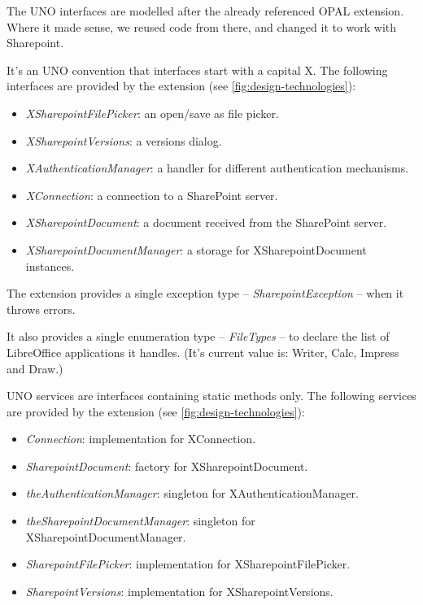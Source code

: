The UNO interfaces are modelled after the already referenced OPAL extension.
Where it made sense, we reused code from there, and changed it to work with
Sharepoint.

It's an UNO convention that interfaces start with a capital X. The following
interfaces are provided by the extension (see \autoref{fig:design-technologies}):

\begin{itemize}
\item \emph{XSharepointFilePicker}: an open/save as file picker.
\item \emph{XSharepointVersions}: a versions dialog.
\item \emph{XAuthenticationManager}: a handler for different authentication mechanisms.
\item \emph{XConnection}: a connection to a SharePoint server.
\item \emph{XSharepointDocument}: a document received from the
SharePoint server.
\item \emph{XSharepointDocumentManager}: a storage for XSharepointDocument instances.
\end{itemize}

The extension provides a single exception type -- \emph{SharepointException} --
when it throws errors.

It also provides a single enumeration type -- \emph{FileTypes} -- to declare
the list of LibreOffice applications it handles. (It's current value is:
Writer, Calc, Impress and Draw.)

UNO services are interfaces containing static methods only.  The following
services are provided by the extension (see \autoref{fig:design-technologies}):

\begin{itemize}
\item \emph{Connection}: implementation for XConnection.
\item \emph{SharepointDocument}: factory for XSharepointDocument.
\item \emph{theAuthenticationManager}: singleton for XAuthenticationManager.
\item \emph{theSharepointDocumentManager}: singleton for XSharepointDocumentManager.
\item \emph{SharepointFilePicker}: implementation for XSharepointFilePicker.
\item \emph{SharepointVersions}: implementation for XSharepointVersions.
\end{itemize}

